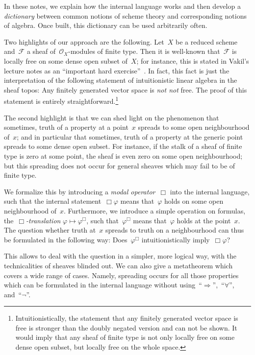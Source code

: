 \documentclass[10pt]{amsart}
\theoremstyle{definition}
\theoremstyle{plain}
\theoremstyle{remark}
\newcommand{\F}{\mathcal{F}}
\renewcommand{\O}{\mathcal{O}}
\newcommand{\?}{\,{:}\,}
\renewcommand{\_}{\mathpunct{.}\,}
\begin{document}
In these notes, we explain how the internal language works and then develop a
\emph{dictionary} between common notions of scheme theory and corresponding
notions of algebra. Once built, this dictionary can be used arbitrarily often.

Two highlights of our approach are the following. Let~$X$ be a reduced scheme
and~$\F$ a sheaf of~$\O_X$-modules of finite type. Then it is well-known
that~$\F$ is locally free on some dense open subset of~$X$; for instance, this
is stated in Vakil's lecture notes as an ``important hard
exercise''~\cite[exercise~13.7.K]{vakil:foag}. In fact, this fact is just the
interpretation of the following statement of intuitionistic linear algebra in
the sheaf topos: Any finitely generated vector space is \emph{not not} free.
The proof of this statement is entirely straightforward.\footnote{Intuitionistically,
the statement that any finitely generated vector space is free is stronger than
the doubly negated version and can not be shown. It would imply that any sheaf
of finite type is not only locally free on some dense open subset, but locally
free on the whole space.}

The second highlight is that we can shed light on the phenomenon that
sometimes, truth of a property at a point~$x$ spreads to some open
neighbourhood of~$x$; and in particular that sometimes, truth of a property at
the generic point spreads to some dense open subset. For instance, if the stalk
of a sheaf of finite type is zero at some point, the sheaf is even zero on some
open neighbourhood; but this spreading does not occur for general sheaves which
may fail to be of finite type.

We formalize this by introducing a \emph{modal operator}~$\Box$ into the
internal language, such that the internal statement~$\Box\varphi$ means
that~$\varphi$ holds on some open neighbourhood of~$x$. Furthermore, we
introduce a simple operation on formulas, the~\emph{$\Box$-translation}
$\varphi \mapsto \varphi^\Box$, such that~$\varphi^\Box$ means that~$\varphi$
holds at the point~$x$. The question whether truth at~$x$ spreads to truth on a
neighbourhood can thus be formulated in the following way: Does~$\varphi^\Box$
intuitionistically imply~$\Box\varphi$?

This allows to deal with the question in a simpler, more logical way, with the
technicalities of sheaves blinded out. We can also give a metatheorem which
covers a wide range of cases. Namely, spreading occurs for all those properties
which can be formulated in the internal language without
using~``$\Rightarrow$'',~``$\forall$'', and~``$\neg$''.
\end{document}
